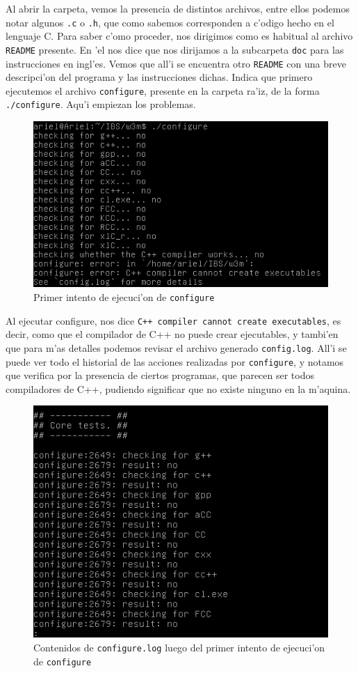 \documentclass[11pt]{article}
\begin{document}
	Al abrir la carpeta, vemos la presencia de distintos archivos, entre ellos podemos notar algunos \texttt{.c} o \texttt{.h}, que como sabemos corresponden a c'odigo hecho en el lenguaje C. Para saber c'omo proceder, nos dirigimos como es habitual al archivo \texttt{README} presente. En 'el nos dice que nos dirijamos a la subcarpeta \texttt{doc} para las instrucciones en ingl'es. Vemos que all'i se encuentra otro \texttt{README} con una breve descripci'on del programa y las instrucciones dichas. Indica que primero ejecutemos el archivo \texttt{configure}, presente en la carpeta ra'iz, de la forma \texttt{./configure}. Aqu'i empiezan los problemas.
	
	\begin{figure}[H]
		\centering
		\includegraphics[width=.8\linewidth]{Images/Compile_w3m/g++_missing}
		\caption{Primer intento de ejecuci'on de \texttt{configure}}
	\end{figure}
	
	Al ejecutar configure, nos dice \texttt{C++ compiler cannot create executables}, es decir, como que el compilador de C++ no puede crear ejecutables, y tambi'en que para m'as detalles podemos revisar el archivo generado \texttt{config.log}. All'i se puede ver todo el historial de las acciones realizadas por \texttt{configure}, y notamos que verifica por la presencia de ciertos programas, que parecen ser todos compiladores de C++, pudiendo significar que no existe ninguno en la m'aquina.
	
	\begin{figure}[H]
		\centering \captionsetup{justification=centering}
		\includegraphics[width=.7\linewidth]{Images/Compile_w3m/g++_missing_log}
		\caption{Contenidos de \texttt{configure.log} luego del primer intento de ejecuci'on de \texttt{configure}}
	\end{figure}
	
\end{document}
